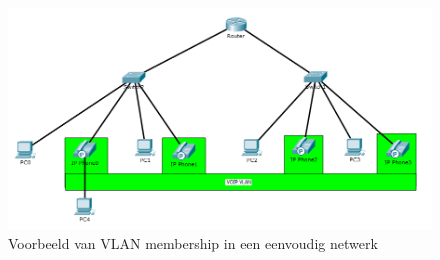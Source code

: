 \documentclass[pdftex,a4paper,12pt,twoside]{report}
\begin{document}
\begin{figure}[H]

\caption{Voorbeeld van VLAN membership in een eenvoudig netwerk \protect \footnotemark}
\includegraphics[scale=0.7]{img/VLAN}
\end{figure}
\end{document}
